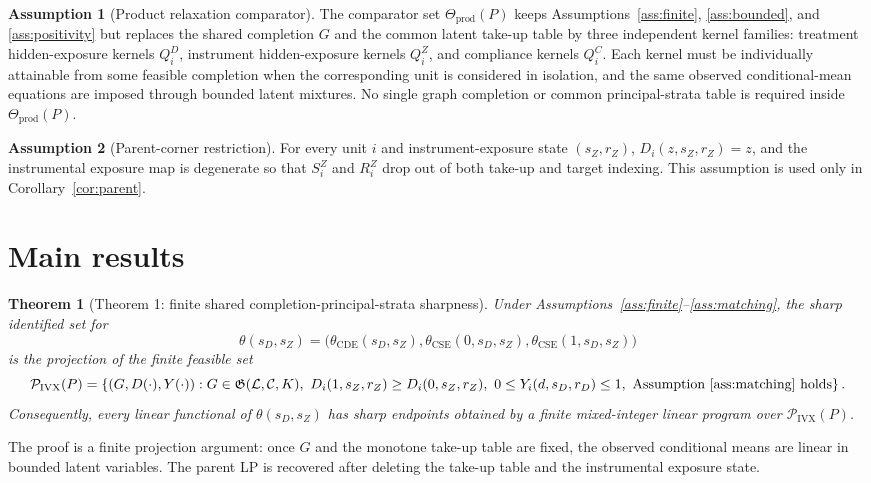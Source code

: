 \documentclass[11pt]{article}
\newcommand{\calP}{\mathcal{P}}
\theoremstyle{definition}
\newtheorem{assumption}{Assumption}
\theoremstyle{plain}
\newtheorem{theorem}{Theorem}
\theoremstyle{remark}
\begin{document}
\begin{assumption}[Product relaxation comparator]\label{ass:product}
The comparator set \(\Theta_{\mathrm{prod}}(P)\) keeps Assumptions~\ref{ass:finite}, \ref{ass:bounded}, and \ref{ass:positivity} but replaces the shared completion \(G\) and the common latent take-up table by three independent kernel families: treatment hidden-exposure kernels \(Q_i^D\), instrument hidden-exposure kernels \(Q_i^Z\), and compliance kernels \(Q_i^C\). Each kernel must be individually attainable from some feasible completion when the corresponding unit is considered in isolation, and the same observed conditional-mean equations are imposed through bounded latent mixtures. No single graph completion or common principal-strata table is required inside \(\Theta_{\mathrm{prod}}(P)\).
\end{assumption}

\begin{assumption}[Parent-corner restriction]\label{ass:parent-corner}
For every unit \(i\) and instrument-exposure state \((s_Z,r_Z)\), \(D_i(z,s_Z,r_Z)=z\), and the instrumental exposure map is degenerate so that \(S_i^Z\) and \(R_i^Z\) drop out of both take-up and target indexing. This assumption is used only in Corollary~\ref{cor:parent}.
\end{assumption}

\section{Main results}
\begin{theorem}[Theorem 1: finite shared completion-principal-strata sharpness]\label{thm:polytope}
Under Assumptions~\ref{ass:finite}--\ref{ass:matching}, the sharp identified set for
\[
\theta(s_D,s_Z)=\big(\theta_{\mathrm{CDE}}(s_D,s_Z),\theta_{\mathrm{CSE}}(0,s_D,s_Z),\theta_{\mathrm{CSE}}(1,s_D,s_Z)\big)
\]
is the projection of the finite feasible set
\[
\calP_{\mathrm{IVX}}(P)
=
\left\{
(G,D(\cdot),Y(\cdot)):
G\in\mathfrak G(\mathcal L,\mathcal C,K),\
D_i(1,s_Z,r_Z)\ge D_i(0,s_Z,r_Z),\
0\le Y_i(d,s_D,r_D)\le1,\
\text{Assumption~\ref{ass:matching} holds}
\right\}.
\]
Consequently, every linear functional of \(\theta(s_D,s_Z)\) has sharp endpoints obtained by a finite mixed-integer linear program over \(\calP_{\mathrm{IVX}}(P)\).
\end{theorem}
The proof is a finite projection argument: once \(G\) and the monotone take-up table are fixed, the observed conditional means are linear in bounded latent variables. The parent LP is recovered after deleting the take-up table and the instrumental exposure state.
\end{document}
